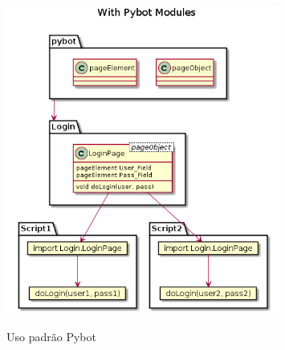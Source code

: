     \begin{figure}
        \vspace*{0,3cm}
        \centering
        \caption{Uso padrão Pybot}
        \includegraphics[width=0.8\textwidth]{./04-figuras/page_object_pybot}
        \label{fig:pybot_module}
    \end{figure}




